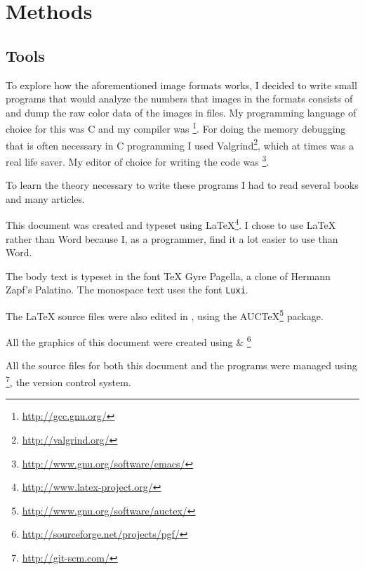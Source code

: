\begin{comment}
  
\end{comment}

\chapter{Methods}
\label{cha:method}

\newcommand{\CC}{C\nolinebreak\hspace{-.05em}\raisebox{.4ex}{\tiny\bf +}\nolinebreak\hspace{-.10em}\raisebox{.4ex}{\tiny\bf +}}

\section{Tools}

\newcommand{\credits}[1]{\footnote{\url{#1}}}

To explore how the aforementioned image formats works, I decided to
write small programs that would analyze the numbers that images in the
formats consists of and dump the raw color data of the images in
files. My programming language of choice for this was \CC{} and my
compiler was \gcc\credits{http://gcc.gnu.org/}. For doing the memory
debugging that is often necessary in \CC{} programming I used
Valgrind\credits{http://valgrind.org/}, which at times was a real life
saver. My editor of choice for writing the code was
\emacs\credits{http://www.gnu.org/software/emacs/}.

To learn the theory necessary to write these programs I had to read
several books and many articles.

This document was created and typeset using
\LaTeX{}\credits{http://www.latex-project.org/}. I chose to use
\LaTeX{} rather than Word because I, as a programmer, find it a lot
easier to use than Word.

The body text is typeset in the font \TeX{} Gyre Pagella, a clone of
Hermann Zapf's Palatino. The monospace text uses the font
\texttt{Luxi}.

The \LaTeX{} source files were also edited in \emacs, using the
AUC\TeX{}\credits{http://www.gnu.org/software/auctex/} package.

All the graphics of this document were created using
\tikzname \& \pgf\credits{http://sourceforge.net/projects/pgf/}

All the source files for both this document and the programs were
managed using \git\credits{http://git-scm.com/}, the version control system.


